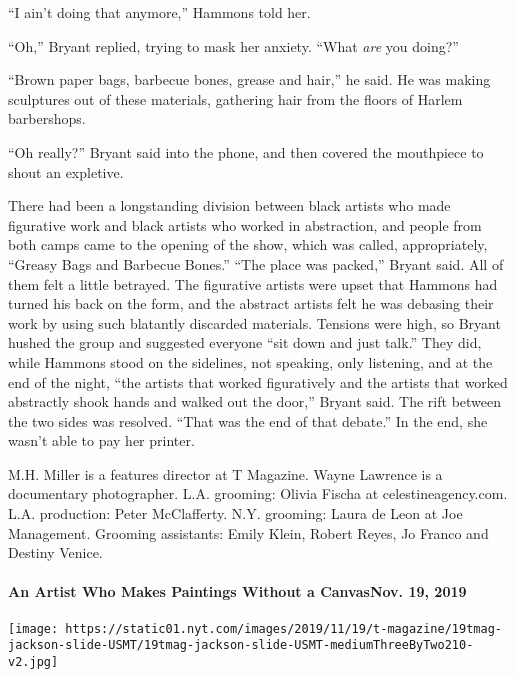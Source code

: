 ``I ain't doing that anymore,'' Hammons told her.

``Oh,'' Bryant replied, trying to mask her anxiety. ``What \emph{are}
you doing?''

``Brown paper bags, barbecue bones, grease and hair,'' he said. He was
making sculptures out of these materials, gathering hair from the floors
of Harlem barbershops.

``Oh really?'' Bryant said into the phone, and then covered the
mouthpiece to shout an expletive.

There had been a longstanding division between black artists who made
figurative work and black artists who worked in abstraction, and people
from both camps came to the opening of the show, which was called,
appropriately, ``Greasy Bags and Barbecue Bones.'' ``The place was
packed,'' Bryant said. All of them felt a little betrayed. The
figurative artists were upset that Hammons had turned his back on the
form, and the abstract artists felt he was debasing their work by using
such blatantly discarded materials. Tensions were high, so Bryant hushed
the group and suggested everyone ``sit down and just talk.'' They did,
while Hammons stood on the sidelines, not speaking, only listening, and
at the end of the night, ``the artists that worked figuratively and the
artists that worked abstractly shook hands and walked out the door,''
Bryant said. The rift between the two sides was resolved. ``That was the
end of that debate.'' In the end, she wasn't able to pay her printer.

M.H. Miller is a features director at T Magazine. Wayne Lawrence is a
documentary photographer. L.A. grooming: Olivia Fischa at
celestineagency.com. L.A. production: Peter McClafferty. N.Y. grooming:
Laura de Leon at Joe Management. Grooming assistants: Emily Klein,
Robert Reyes, Jo Franco and Destiny Venice.

\href{https://www.nytimes.com/2019/11/19/t-magazine/suzanne-jackson-artist.html}{}

\hypertarget{an-artist-who-makes-paintings-without-a-canvasnov-19-2019}{%
\paragraph{An Artist Who Makes Paintings Without a CanvasNov. 19,
2019}\label{an-artist-who-makes-paintings-without-a-canvasnov-19-2019}}

\texttt{[image: https://static01.nyt.com/images/2019/11/19/t-magazine/19tmag-jackson-slide-USMT/19tmag-jackson-slide-USMT-mediumThreeByTwo210-v2.jpg]}
\href{https://www.nytimes.com/2018/09/28/t-magazine/art/charles-white-moma-retrospective.html}{}

